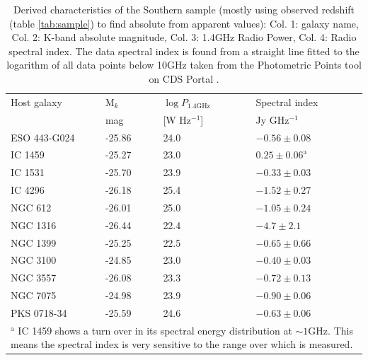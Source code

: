 	\begin{table}
		\centering
		\caption{Derived characteristics of the Southern sample (mostly using observed redshift (table \ref{tab:sample}) to find absolute from apparent values): Col. 1: galaxy name, Col. 2: K-band absolute magnitude, Col. 3: 1.4GHz Radio Power, Col. 4: Radio spectral index. The data spectral index is found from a straight line fitted to the logarithm of all data points below 10GHz taken from the Photometric Points tool on CDS Portal \citep{Wenger2000}.}
		\label{tab:sampleDerived}
		\begin{tabular}{l l l l}
			\hline
			\hline
			Host galaxy	& M$_k$ & $\log P_\text{1.4GHz}$ & Spectral index 	\\
						& mag 	& [W Hz$^{-1}$]			& Jy GHz$^{-1}$		\\
			\hline 
			ESO 443-G024 & -25.86 & 24.0 				& $-0.56 \pm 0.08$	\\
			IC 1459 	& -25.27 & 23.0 				& $0.25 \pm 0.06^\text{a}$ 	\\
			IC 1531 	& -25.70 & 23.9 				& $-0.33 \pm 0.03$ 	\\
			IC 4296		& -26.18 & 25.4 				& $-1.52 \pm 0.27$ 	\\
			NGC 612 	& -26.01 & 25.0 				& $-1.05 \pm 0.24$ 	\\
			NGC 1316 	& -26.44 & 22.4 				& $-4.7 \pm 2.1$ 	\\
			NGC 1399 	& -25.25 & 22.5 				& $-0.65 \pm 0.66$ 	\\
			NGC 3100 	& -24.85 & 23.0 				& $-0.40 \pm 0.03$ 	\\
			NGC 3557 	& -26.08 & 23.3 				& $-0.72 \pm 0.13$ 	\\
			NGC 7075 	& -24.98 & 23.9 				& $-0.90 \pm 0.06$ 	\\
			PKS 0718-34 & -25.59 & 24.6 				& $-0.63 \pm 0.06$ 	\\
			\hline
			\hline
			\multicolumn{4}{L{.6\textwidth}}{\footnotesize $^\text{a}$ IC 1459 shows a turn over in its spectral energy distribution at $\sim 1 \text{GHz}$. This means the spectral index is very sensitive to the range over which is measured.} \\ %

		\end{tabular}
	\end{table}
	














